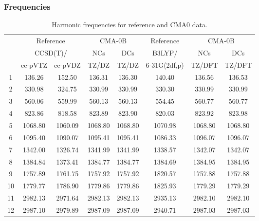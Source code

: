 \documentclass[10pt,oneside]{article}
\begin{document}
\clearpage

\subsubsection*{Frequencies}
\begin{table}[h!]
\centering
\caption{Harmonic frequencies for reference and CMA0 data.}
\begin{tabular}{cccccccc}
\toprule
{} & \multicolumn{2}{c}{Reference} & \multicolumn{2}{c}{CMA-0B} &    Reference & \multicolumn{2}{c}{CMA-0B} \\
{} & \multicolumn{2}{c}{CCSD(T)/} &     NCs &     DCs &       B3LYP/ &     NCs &     DCs \\
{} &   cc-pVTZ & cc-pVDZ &   TZ/DZ &   TZ/DZ & 6-31G(2df,p) &  TZ/DFT &  TZ/DFT \\
\midrule
1  &    136.26 &  152.50 &  136.31 &  136.30 &       140.40 &  136.56 &  136.53 \\
2  &    330.98 &  324.75 &  330.99 &  330.99 &       330.30 &  330.99 &  330.99 \\
3  &    560.06 &  559.99 &  560.13 &  560.13 &       554.45 &  560.77 &  560.77 \\
4  &    823.86 &  818.58 &  823.89 &  823.90 &       820.03 &  823.92 &  823.98 \\
5  &   1068.80 & 1060.09 & 1068.80 & 1068.80 &      1070.98 & 1068.80 & 1068.80 \\
6  &   1095.40 & 1090.07 & 1095.41 & 1095.41 &      1086.33 & 1096.07 & 1096.07 \\
7  &   1342.00 & 1326.74 & 1341.99 & 1341.99 &      1338.57 & 1342.07 & 1342.07 \\
8  &   1384.84 & 1373.41 & 1384.77 & 1384.77 &      1384.69 & 1384.95 & 1384.95 \\
9  &   1757.89 & 1761.75 & 1757.92 & 1757.92 &      1820.57 & 1757.88 & 1757.88 \\
10 &   1779.77 & 1786.90 & 1779.86 & 1779.86 &      1825.93 & 1779.29 & 1779.29 \\
11 &   2982.13 & 2971.64 & 2982.13 & 2982.13 &      2935.13 & 2982.10 & 2982.10 \\
12 &   2987.10 & 2979.89 & 2987.09 & 2987.09 &      2940.71 & 2987.03 & 2987.03 \\
\bottomrule
\end{tabular}
\end{table}

\clearpage
\end{document}
